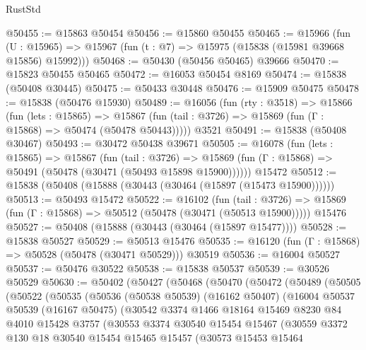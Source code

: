 \begin{lexlean}{RustStd}
\begin{coremodule}
@50455 := @15863 @50454
@50456 := @15860 @50455
@50465 := @15966
    (fun (U : @15965) => @15967 (fun (t : @7) => @15975 (@15838 (@15981 @39668 @15856) @15992)))
@50468 := @50430 (@50456 @50465) @39666
@50470 := @15823 @50455 @50465
@50472 := @16053 @50454 @8169
@50474 := @15838 (@50408 @30445)
@50475 := @50433 @30448
@50476 := @15909 @50475
@50478 := @15838 (@50476 @15930)
@50489 := @16056
    (fun (rty : @3518) =>
    @15866
      (fun (lets : @15865) =>
      @15867 (fun (tail : @3726) => @15869 (fun (Γ : @15868) => @50474 (@50478 @50443)))))
    @3521
@50491 := @15838 (@50408 @30467)
@50493 := @30472 @50438 @39671
@50505 := @16078
    (fun (lets : @15865) =>
    @15867
      (fun (tail : @3726) =>
      @15869 (fun (Γ : @15868) => @50491 (@50478 (@30471 (@50493 @15898 @15900))))))
    @15472
@50512 := @15838 (@50408 (@15888 (@30443 (@30464 (@15897 (@15473 @15900))))))
@50513 := @50493 @15472
@50522 := @16102
    (fun (tail : @3726) => @15869 (fun (Γ : @15868) => @50512 (@50478 (@30471 (@50513 @15900)))))
    @15476
@50527 := @50408 (@15888 (@30443 (@30464 (@15897 @15477))))
@50528 := @15838 @50527
@50529 := @50513 @15476
@50535 := @16120 (fun (Γ : @15868) => @50528 (@50478 (@30471 @50529))) @30519
@50536 := @16004 @50527
@50537 := @50476 @30522
@50538 := @15838 @50537
@50539 := @30526 @50529
@50630 := @50402
    (@50427
      (@50468
        (@50470
          (@50472
            (@50489
              (@50505
                (@50522
                  (@50535
                    (@50536
                      (@50538 @50539)
                      (@16162 @50407)
                      (@16004
                        @50537
                        @50539
                        (@16167 @50475)
                        (@30542
                          @3374
                          @1466
                          @18164
                          @15469
                          @8230
                          @84
                          @4010
                          @15428
                          @3757
                          (@30553
                            @3374
                            @30540
                            @15454
                            @15467
                            (@30559
                              @3372
                              @130
                              @18
                              @30540
                              @15454
                              @15465
                              @15457
                              (@30573
                                @15453
                                @15464

\end{coremodule}
\end{lexlean}
